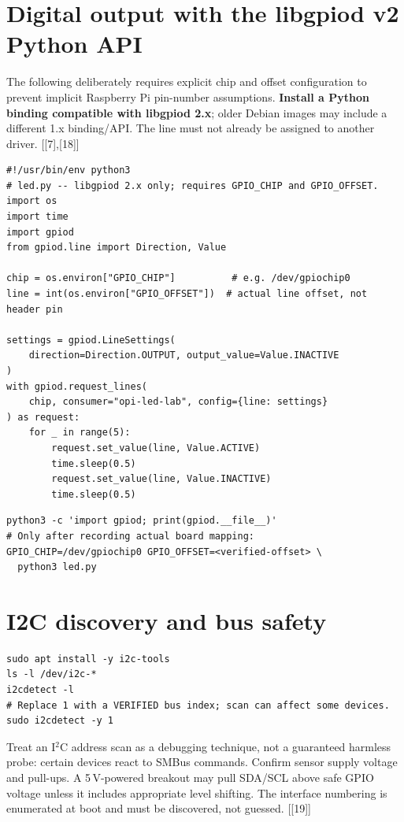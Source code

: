 \documentclass[10pt,oneside,openany]{report}
\newcommand{\smallref}[1]{{\sffamily\scriptsize\color{slate}[#1]}}
\begin{document}
\section{Digital output with the libgpiod v2 Python API}
The following deliberately requires explicit chip and offset configuration to prevent implicit Raspberry Pi pin-number assumptions. \textbf{Install a Python binding compatible with libgpiod 2.x}; older Debian images may include a different 1.x binding/API. The line must not already be assigned to another driver. \smallref{[7],[18]}
\begin{lstlisting}[style=python]
#!/usr/bin/env python3
# led.py -- libgpiod 2.x only; requires GPIO_CHIP and GPIO_OFFSET.
import os
import time
import gpiod
from gpiod.line import Direction, Value

chip = os.environ["GPIO_CHIP"]          # e.g. /dev/gpiochip0
line = int(os.environ["GPIO_OFFSET"])  # actual line offset, not header pin

settings = gpiod.LineSettings(
    direction=Direction.OUTPUT, output_value=Value.INACTIVE
)
with gpiod.request_lines(
    chip, consumer="opi-led-lab", config={line: settings}
) as request:
    for _ in range(5):
        request.set_value(line, Value.ACTIVE)
        time.sleep(0.5)
        request.set_value(line, Value.INACTIVE)
        time.sleep(0.5)
\end{lstlisting}
\begin{lstlisting}[style=sh]
python3 -c 'import gpiod; print(gpiod.__file__)'
# Only after recording actual board mapping:
GPIO_CHIP=/dev/gpiochip0 GPIO_OFFSET=<verified-offset> \
  python3 led.py
\end{lstlisting}
\section{I2C discovery and bus safety}
\begin{lstlisting}[style=sh]
sudo apt install -y i2c-tools
ls -l /dev/i2c-*
i2cdetect -l
# Replace 1 with a VERIFIED bus index; scan can affect some devices.
sudo i2cdetect -y 1
\end{lstlisting}
Treat an I\(^{2}\)C address scan as a debugging technique, not a guaranteed harmless probe: certain devices react to SMBus commands. Confirm sensor supply voltage and pull-ups. A 5\,V-powered breakout may pull SDA/SCL above safe GPIO voltage unless it includes appropriate level shifting. The interface numbering is enumerated at boot and must be discovered, not guessed. \smallref{[19]}
\end{document}
